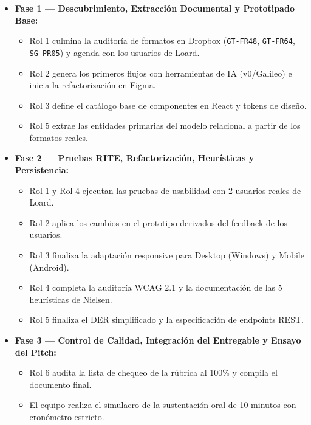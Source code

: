 \documentclass[11pt,letterpaper]{article}
\begin{document}
\begin{itemize}
    \item \textbf{Fase 1 --- Descubrimiento, Extracción Documental y Prototipado Base:}
    \begin{itemize}
        \item Rol 1 culmina la auditoría de formatos en Dropbox (\texttt{GT-FR48}, \texttt{GT-FR64}, \texttt{SG-PR05}) y agenda con los usuarios de Loard.
        \item Rol 2 genera los primeros flujos con herramientas de IA (v0/Galileo) e inicia la refactorización en Figma.
        \item Rol 3 define el catálogo base de componentes en React y tokens de diseño.
        \item Rol 5 extrae las entidades primarias del modelo relacional a partir de los formatos reales.
    \end{itemize}
    \item \textbf{Fase 2 --- Pruebas RITE, Refactorización, Heurísticas y Persistencia:}
    \begin{itemize}
        \item Rol 1 y Rol 4 ejecutan las pruebas de usabilidad con 2 usuarios reales de Loard.
        \item Rol 2 aplica los cambios en el prototipo derivados del feedback de los usuarios.
        \item Rol 3 finaliza la adaptación responsive para Desktop (Windows) y Mobile (Android).
        \item Rol 4 completa la auditoría WCAG 2.1 y la documentación de las 5 heurísticas de Nielsen.
        \item Rol 5 finaliza el DER simplificado y la especificación de endpoints REST.
    \end{itemize}
    \item \textbf{Fase 3 --- Control de Calidad, Integración del Entregable y Ensayo del Pitch:}
    \begin{itemize}
        \item Rol 6 audita la lista de chequeo de la rúbrica al 100\% y compila el documento final.
        \item El equipo realiza el simulacro de la sustentación oral de 10 minutos con cronómetro estricto.
    \end{itemize}
\end{itemize}
\end{document}
